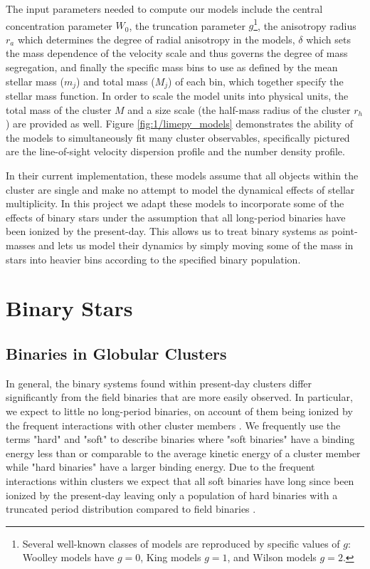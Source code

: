 The input parameters needed to compute our models include the central concentration parameter $W_0$,
the truncation parameter $g$\footnote{Several well-known classes of models are reproduced by
	specific values of $g$: Woolley models \citep{Woolley1954} have $g=0$, King models \citep{King1966}
	$g=1$, and Wilson models \citep{Wilson1975} $g=2$.}, the anisotropy radius $r_a$ which determines
the degree of radial anisotropy in the models, $\delta$ which sets the mass dependence of the
velocity scale and thus governs the degree of mass segregation, and finally the specific mass bins
to use as defined by the mean stellar mass ($m_j$) and total mass ($M_j$) of each bin, which
together specify the stellar mass function. In order to scale the model units into physical units,
the total mass of the cluster $M$ and a size scale (the half-mass radius of the cluster $r_h$) are
provided as well. Figure \ref{fig:1/limepy_models} demonstrates the ability of the models to
simultaneously fit many cluster observables, specifically pictured are the line-of-sight velocity
dispersion profile and the number density profile.


In their current implementation, these models assume that all objects within the cluster are single
and make no attempt to model the dynamical effects of stellar multiplicity. In this project we adapt
these models to incorporate some of the effects of binary stars under the assumption that all
long-period binaries have been ionized by the present-day. This allows us to treat binary systems as
point-masses and lets us model their dynamics by simply moving some of the mass in stars into
heavier bins according to the specified binary population.



\section{Binary Stars}
\subsection{Binaries in Globular Clusters}


In general, the binary systems found within present-day clusters differ significantly from the field
binaries that are more easily observed. In particular, we expect to little no long-period binaries,
on account of them being ionized by the frequent interactions with other cluster members
\citep{Heggie2003}. We frequently use the terms "hard" and "soft" to describe binaries where "soft
binaries" have a binding energy less than or comparable to the average kinetic energy of a cluster
member while "hard binaries" have a larger binding energy. Due to the frequent interactions within
clusters we expect that all soft binaries have long since been ionized by the present-day leaving
only a population of hard binaries with a truncated period distribution compared to field binaries
\citep{Heggie2003}.




